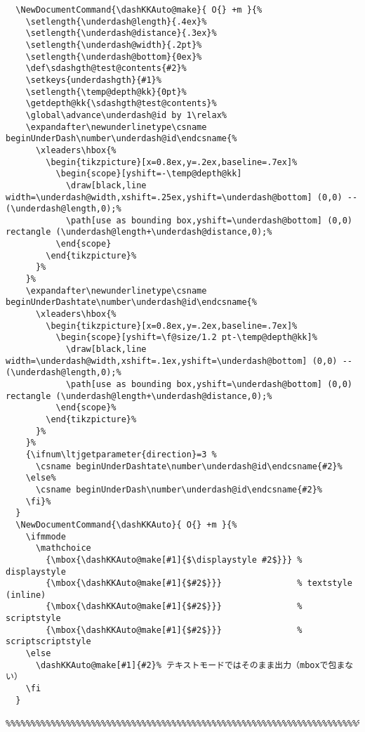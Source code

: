 \documentclass[luatex,fontsize=8pt,paper=b5,twoside]{jlreq}%
\begin{document}
\begin{lstlisting}
  \NewDocumentCommand{\dashKKAuto@make}{ O{} +m }{%
    \setlength{\underdash@length}{.4ex}%
    \setlength{\underdash@distance}{.3ex}%
    \setlength{\underdash@width}{.2pt}%
    \setlength{\underdash@bottom}{0ex}%
    \def\sdashgth@test@contents{#2}%
    \setkeys{underdashgth}{#1}%
    \setlength{\temp@depth@kk}{0pt}%
    \getdepth@kk{\sdashgth@test@contents}%
    \global\advance\underdash@id by 1\relax%
    \expandafter\newunderlinetype\csname beginUnderDash\number\underdash@id\endcsname{%
      \xleaders\hbox{%
        \begin{tikzpicture}[x=0.8ex,y=.2ex,baseline=.7ex]%
          \begin{scope}[yshift=-\temp@depth@kk]
            \draw[black,line width=\underdash@width,xshift=.25ex,yshift=\underdash@bottom] (0,0) -- (\underdash@length,0);%
            \path[use as bounding box,yshift=\underdash@bottom] (0,0) rectangle (\underdash@length+\underdash@distance,0);%
          \end{scope}
        \end{tikzpicture}%
      }%
    }%
    \expandafter\newunderlinetype\csname beginUnderDashtate\number\underdash@id\endcsname{%
      \xleaders\hbox{%
        \begin{tikzpicture}[x=0.8ex,y=.2ex,baseline=.7ex]%
          \begin{scope}[yshift=\f@size/1.2 pt-\temp@depth@kk]%
            \draw[black,line width=\underdash@width,xshift=.1ex,yshift=\underdash@bottom] (0,0) -- (\underdash@length,0);%
            \path[use as bounding box,yshift=\underdash@bottom] (0,0) rectangle (\underdash@length+\underdash@distance,0);%
          \end{scope}%
        \end{tikzpicture}%
      }%
    }%
    {\ifnum\ltjgetparameter{direction}=3 %
      \csname beginUnderDashtate\number\underdash@id\endcsname{#2}%
    \else%
      \csname beginUnderDash\number\underdash@id\endcsname{#2}%
    \fi}%
  }
  \NewDocumentCommand{\dashKKAuto}{ O{} +m }{%
    \ifmmode
      \mathchoice
        {\mbox{\dashKKAuto@make[#1]{$\displaystyle #2$}}} % displaystyle
        {\mbox{\dashKKAuto@make[#1]{$#2$}}}               % textstyle (inline)
        {\mbox{\dashKKAuto@make[#1]{$#2$}}}               % scriptstyle
        {\mbox{\dashKKAuto@make[#1]{$#2$}}}               % scriptscriptstyle
    \else
      \dashKKAuto@make[#1]{#2}% テキストモードではそのまま出力（mboxで包まない）
    \fi
  }
  %%%%%%%%%%%%%%%%%%%%%%%%%%%%%%%%%%%%%%%%%%%%%%%%%%%%%%%%%%%%%%%%%%%%%%%%%%%%%%%%%%%%%%%%%



\end{lstlisting}
\end{document}
